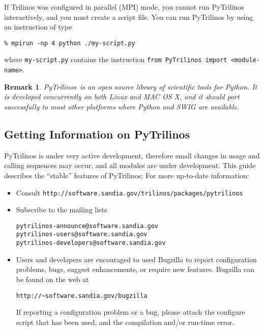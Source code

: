 \documentclass[10pt,relax]{SANDreport}
\newcommand{\PyTrilinos}{{PyTrilinos}}
\newtheorem{remark}{Remark}
\begin{document}
If Trilinos was configured in parallel (MPI) mode, you cannot run PyTrilinos
interactively, and you must create a script file. You can run PyTrilinos by
using an instruction of type
\begin{verbatim}
% mpirun -np 4 python ./my-script.py
\end{verbatim}
where \verb!my-script.py! contains the instruction \verb!from PyTrilinos import <module-name>!.

\begin{remark}
\PyTrilinos\ is an open source library of scientific tools for Python.
It is developed concurrently on both Linux and MAC OS X, and it should
port successfully to most other platforms where Python and SWIG are available.
\end{remark}

\subsection{Getting Information on \PyTrilinos}
\label{sec:getting}

PyTrilinos is under very active development, therefore small changes in usage
and calling sequences may occur, and all modules are under development. This
guide describes the ``stable'' features of PyTrilinos; For more up-to-date
information:
\begin{itemize}
\item Consult \verb!http://software.sandia.gov/trilinos/packages/pytrilinos!
\item Subscribe to the mailing lists
\begin{verbatim}
pytrilinos-announce@software.sandia.gov
pytrilinos-users@software.sandia.gov
pytrilinos-developers@software.sandia.gov
\end{verbatim}
\item Users and developers are encouraged to used Bugzilla to report
configuration problems, bugs, suggest enhancements, or require new features.
Bugzilla can be found on the web at
\begin{verbatim}
http://~software.sandia.gov/bugzilla
\end{verbatim}
If reporting a configuration problem or a bug, please attach the configure
script that has been used, and the compilation and/or run-time error.
\end{itemize}
\end{document}

